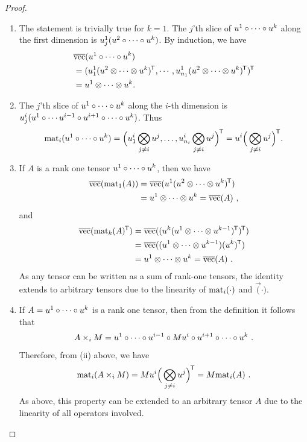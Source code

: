 \begin{proof}%
\begin{enumerate}[nosep,label=(\roman*),leftmargin=0pt,itemindent=4ex]
\item
The statement is trivially true for $k=1$.
The $j$'th slice of $u^1 \circ \cdots \circ u^k$ along the first dimension is $u^1_j(u^2 \circ \cdots \circ u^k)$.
By induction, we have
\begin{align*}
&\overline{\mathrm{vec}}(u^1 \circ \cdots \circ u^k)\\
&= (u^1_1(u^2 \otimes \cdots \otimes u^k)^{\mkern-1.5mu\scriptstyle\mathsf{T}}, \cdots, u^1_{n_1}(u^2 \otimes \cdots \otimes u^k)^{\mkern-1.5mu\scriptstyle\mathsf{T}})^{\mkern-1.5mu\scriptstyle\mathsf{T}}\\
&= u^1 \otimes \cdots \otimes u^k
.
\end{align*}
\item
The $j$'th slice of $u^1 \circ \cdots \circ u^k$ along the $i$-th dimension is $u^i_j(u^1 \circ \cdots u^{i-1} \circ u^{i+1}\circ \cdots \circ u^k)$. Thus
\begin{align*}
\mathrm{mat}_{i}(u^1 \circ \cdots \circ u^k)
= \mathopen{}\Big(u^i_1\bigotimes_{j\ne i} u^j, \ldots, u^i_{n_i}\bigotimes_{j\ne i} u^j\Big)^{\mkern-1.5mu\scriptstyle\mathsf{T}}
= u^i \mathopen{}\Big(\bigotimes_{j\ne i} u^j\Big)^{\mkern-1.5mu\scriptstyle\mathsf{T}}
.
\end{align*}
\item
If $A$ is a rank one tensor $u^1 \circ \cdots \circ u^k$, then we have
\begin{align*}
\overline{\mathrm{vec}}(\mathrm{mat}_{1}(A)) &= \overline{\mathrm{vec}}(u^1 (u^2 \otimes \cdots \otimes u^k)^{\mkern-1.5mu\scriptstyle\mathsf{T}})
\\
&=
u^1 \otimes \cdots \otimes u^k
=
\overline{\mathrm{vec}}(A) ~
,
\end{align*}
and
\begin{align*}
\overline{\mathrm{vec}}(\mathrm{mat}_{k}(A)^{\mkern-1.5mu\scriptstyle\mathsf{T}})
&=
\overline{\mathrm{vec}}((u^k (u^1 \otimes \cdots \otimes u^{k-1})^{\mkern-1.5mu\scriptstyle\mathsf{T}})^{\mkern-1.5mu\scriptstyle\mathsf{T}})
\\
&=
\overline{\mathrm{vec}}((u^1 \otimes \cdots \otimes u^{k-1})(u^k)^{\mkern-1.5mu\scriptstyle\mathsf{T}})
\\
&=
u^1 \otimes \cdots \otimes u^k
=
\overline{\mathrm{vec}}(A) ~
.
\end{align*}
As any tensor can be written as a sum of rank-one tensors, the identity extends to arbitrary tensors due to the linearity of $\mathrm{mat}_{i}(\cdot)$ and $\vec(\cdot)$.
\item
If $A = u^1 \circ \cdots \circ u^k$ is a rank one tensor, then from the definition it follows that
\begin{align*}
A \times_i M = u^1 \circ \cdots\circ u^{i-1} \circ Mu^i \circ u^{i+1} \circ \cdots \circ u^k ~ .
\end{align*}
Therefore,  from (ii) above, we have
\begin{align*}
\mathrm{mat}_{i}(A \times_i M) 
= Mu^i  \mathopen{}\Big(\bigotimes_{j\ne i} u^j\Big)^{\mkern-1.5mu\scriptstyle\mathsf{T}}
= M \mathrm{mat}_{i}(A) ~
.
\end{align*}
As above, this property can be extended to an arbitrary tensor $A$ due to the linearity of all operators involved.\qedhere
\end{enumerate}
\end{proof}


